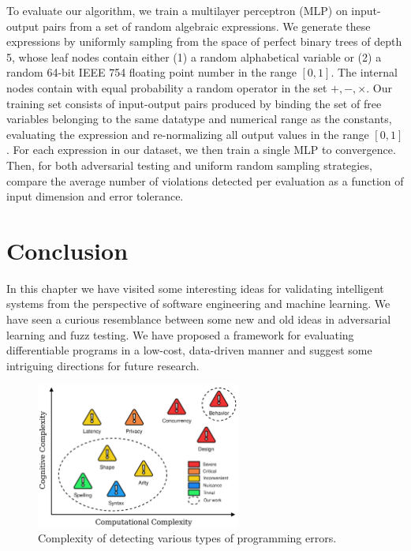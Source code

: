 \documentclass[12pt,initial,twoside,maitrise]{dms}
\numberwithin{equation}{section}
\numberwithin{table}{chapter}
\numberwithin{figure}{chapter}
\begin{document}
To evaluate our algorithm, we train a multilayer perceptron (MLP) on input-output pairs from a set of random algebraic expressions. We generate these expressions by uniformly sampling from the space of perfect binary trees of depth 5, whose leaf nodes contain either (1) a random alphabetical variable or (2) a random 64-bit IEEE 754 floating point number in the range $[0, 1]$. The internal nodes contain with equal probability a random operator in the set ${+, -, \times}$. Our training set consists of input-output pairs produced by binding the set of free variables belonging to the same datatype and numerical range as the constants, evaluating the expression and re-normalizing all output values in the range $[0, 1]$. For each expression in our dataset, we then train a single MLP to convergence. Then, for both adversarial testing and uniform random sampling strategies, compare the average number of violations detected per evaluation as a function of input dimension and error tolerance.

\section{Conclusion}

In this chapter we have visited some interesting ideas for validating intelligent systems from the perspective of software engineering and machine learning. We have seen a curious resemblance between some new and old ideas in adversarial learning and fuzz testing. We have proposed a framework for evaluating differentiable programs in a low-cost, data-driven manner and suggest some intriguing directions for future research.

\begin{figure}
\centering
\includegraphics[width=0.60\textwidth]{../figures/verification_complexity.png}
\caption{Complexity of detecting various types of programming errors.}
\label{fig:verification_complexity}
\end{figure}
\end{document}

